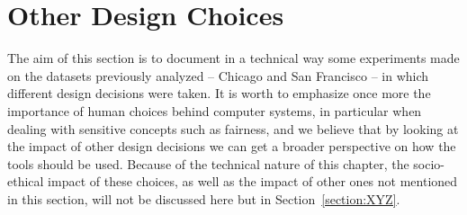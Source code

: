 \section{Other Design Choices}
The aim of this section is to document in a technical way some experiments made on the datasets previously analyzed -- Chicago and San Francisco -- in which different design decisions were taken. It is worth to emphasize once more the importance of human choices behind computer systems, in particular when dealing with sensitive concepts such as fairness, and we believe that by looking at the impact of other design decisions we can get a broader perspective on how the tools should be used.
Because of the technical nature of this chapter, the socio-ethical impact of these choices, as well as the impact of other ones not mentioned in this section, will not be discussed here but in Section~\ref{section:XYZ}.


